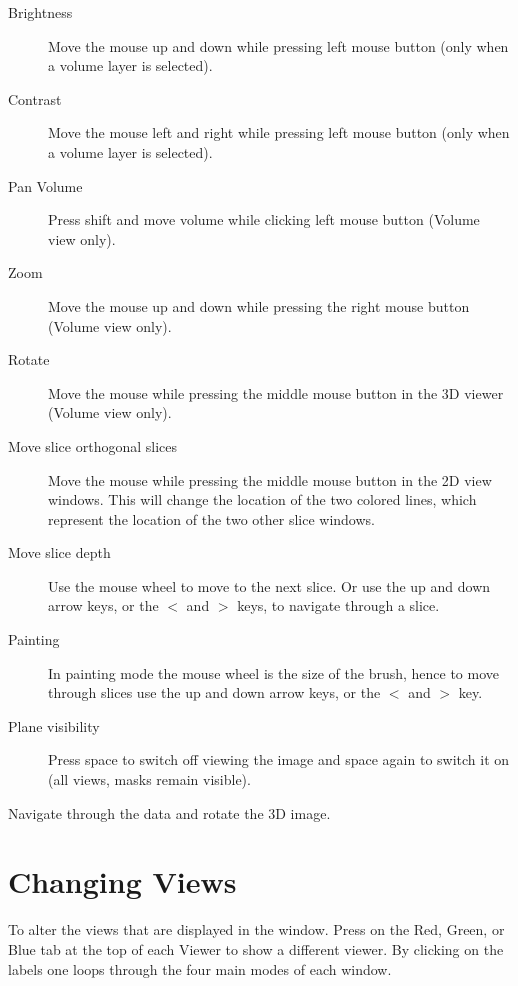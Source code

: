\documentclass[fleqn,11pt,openany]{book}
\begin{document}
\begin{description}
\item[Brightness] Move the mouse up and down while pressing left mouse button (only when a volume layer is selected).

\item[Contrast] Move the mouse left and right while pressing left mouse button (only when a volume layer is selected).

\item[Pan Volume] Press shift and move volume while clicking left mouse button (Volume view only).

\item[Zoom] Move the mouse up and down while pressing the right mouse button (Volume view only).

\item[Rotate] Move the mouse while pressing the middle mouse button in the 3D viewer (Volume view only).

\item[Move slice orthogonal slices] Move the mouse while pressing the middle mouse button in the 2D view windows. This will change the location of the two colored lines, which represent the location of the two other slice windows. 

\item[Move slice depth] Use the mouse wheel to move to the next slice. Or use the up and down arrow keys, or the {\bf $<$} and {\bf $>$} keys, to navigate through a slice.

\item[Painting] In painting mode the mouse wheel is the size of the brush, hence to move through slices use the up and down arrow keys, or the  {\bf $<$} and {\bf  $>$} key. 

\item[Plane visibility] Press space to switch off viewing the image and space again to switch it on (all views, masks remain visible).
 
\end{description}

Navigate through the data and rotate the 3D image.

\section{Changing Views}

To alter the views that are displayed in the window. Press on the Red, Green, or Blue tab at the top of each Viewer to show a different viewer. By clicking on the labels one loops through the four main modes of each window.
\end{document}
